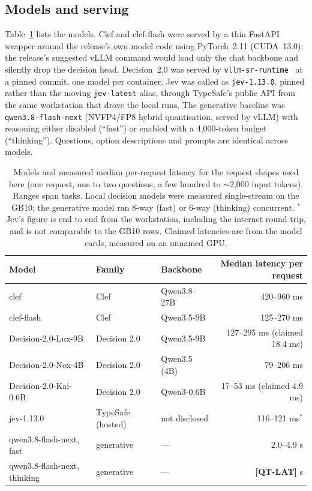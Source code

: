\documentclass[11pt]{article}
\newcommand{\TODO}[1]{\textbf{[#1]}}
\begin{document}
\subsection{Models and serving}
Table~\ref{tab:models} lists the models. Clef and clef-flash were served by a thin FastAPI wrapper
around the release's own model code using PyTorch~2.11 (CUDA~13.0); the release's suggested vLLM
command would load only the chat backbone and silently drop the decision head. Decision~2.0 was served by
\texttt{vllm-sr-runtime}~\cite{vllmsrruntime} at a pinned commit, one model per container. Jev was
called as \texttt{jev-1.13.0}, pinned rather than the moving \texttt{jev-latest} alias, through
TypeSafe's public API from the same workstation that drove the local runs. The generative baseline
was \texttt{qwen3.8-flash-next} (NVFP4/FP8 hybrid quantisation, served by vLLM) with reasoning
either disabled (``fast'') or enabled with a 4{,}000-token budget (``thinking''). Questions,
option descriptions and prompts are identical across models.

\begin{table}[t]
\centering
\small
\begin{tabular}{lllr}
\toprule
Model & Family & Backbone & Median latency per request \\
\midrule
clef & Clef & Qwen3.8-27B & 420--960 ms \\
clef-flash & Clef & Qwen3.5-9B & 125--270 ms \\
Decision-2.0-Lux-9B & Decision 2.0 & Qwen3.5-9B & 127--295 ms (claimed 18.4 ms) \\
Decision-2.0-Nox-4B & Decision 2.0 & Qwen3.5 (4B) & 79--206 ms \\
Decision-2.0-Kai-0.6B & Decision 2.0 & Qwen3-0.6B & 17--53 ms (claimed 4.9 ms) \\
jev-1.13.0 & TypeSafe (hosted) & not disclosed & 116--121 ms$^\ast$ \\
qwen3.8-flash-next, fast & generative & --- & 2.0--4.9 s \\
qwen3.8-flash-next, thinking & generative & --- & \TODO{QT-LAT} s \\
\bottomrule
\end{tabular}
\caption{Models and measured median per-request latency for the request shapes used here (one
request, one to two questions, a few hundred to $\sim$2{,}000 input tokens). Ranges span tasks.
Local decision models were measured single-stream on the GB10; the generative model ran 8-way
(fast) or 6-way (thinking) concurrent. $^\ast$Jev's figure is end to end from the workstation,
including the internet round trip, and is not comparable to the GB10 rows. Claimed latencies are
from the model cards, measured on an unnamed GPU.}
\label{tab:models}
\end{table}
\end{document}
